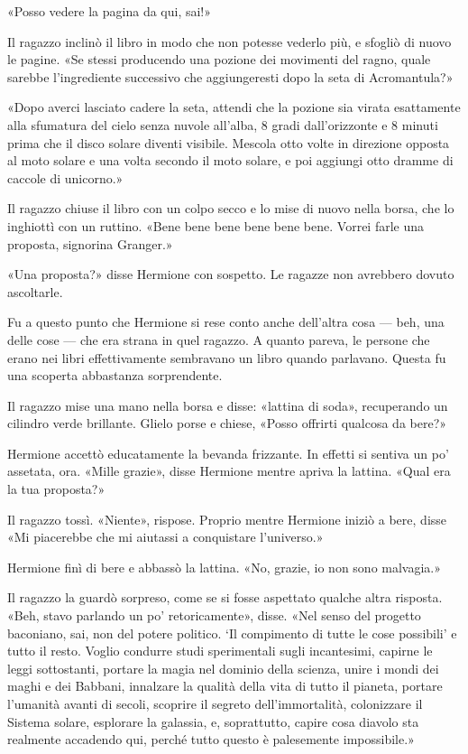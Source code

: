 «Posso vedere la pagina da qui, sai!»

Il ragazzo inclinò il libro in modo che non potesse vederlo più, e sfogliò di nuovo le pagine. «Se stessi producendo una pozione dei movimenti del ragno, quale sarebbe l’ingrediente successivo che aggiungeresti dopo la seta di Acromantula?»

«Dopo averci lasciato cadere la seta, attendi che la pozione sia virata esattamente alla sfumatura del cielo senza nuvole all’alba, 8 gradi dall’orizzonte e 8 minuti prima che il disco solare diventi visibile. Mescola otto volte in direzione opposta al moto solare e una volta secondo il moto solare, e poi aggiungi otto dramme di caccole di unicorno.»

Il ragazzo chiuse il libro con un colpo secco e lo mise di nuovo nella borsa, che lo inghiottì con un ruttino. «Bene bene bene bene bene bene. Vorrei farle una proposta, signorina Granger.»

«Una proposta?» disse Hermione con sospetto. Le ragazze non avrebbero dovuto ascoltarle.

Fu a questo punto che Hermione si rese conto anche dell’altra cosa — beh, una delle cose — che era strana in quel ragazzo. A quanto pareva, le persone che erano nei libri effettivamente sembravano un libro quando parlavano. Questa fu una scoperta abbastanza sorprendente.

Il ragazzo mise una mano nella borsa e disse: «lattina di soda», recuperando un cilindro verde brillante. Glielo porse e chiese, «Posso offrirti qualcosa da bere?»

Hermione accettò educatamente la bevanda frizzante. In effetti si sentiva un po’ assetata, ora. «Mille grazie», disse Hermione mentre apriva la lattina. «Qual era la tua proposta?»

Il ragazzo tossì. «Niente», rispose. Proprio mentre Hermione iniziò a bere, disse «Mi piacerebbe che mi aiutassi a conquistare l’universo.»

Hermione finì di bere e abbassò la lattina. «No, grazie, io non sono malvagia.»

Il ragazzo la guardò sorpreso, come se si fosse aspettato qualche altra risposta. «Beh, stavo parlando un po’ retoricamente», disse. «Nel senso del progetto baconiano, sai, non del potere politico. ‘Il compimento di tutte le cose possibili’ e tutto il resto. Voglio condurre studi sperimentali sugli incantesimi, capirne le leggi sottostanti, portare la magia nel dominio della scienza, unire i mondi dei maghi e dei Babbani, innalzare la qualità della vita di tutto il pianeta, portare l’umanità avanti di secoli, scoprire il segreto dell’immortalità, colonizzare il Sistema solare, esplorare la galassia, e, soprattutto, capire cosa diavolo sta realmente accadendo qui, perché tutto questo è palesemente impossibile.»

